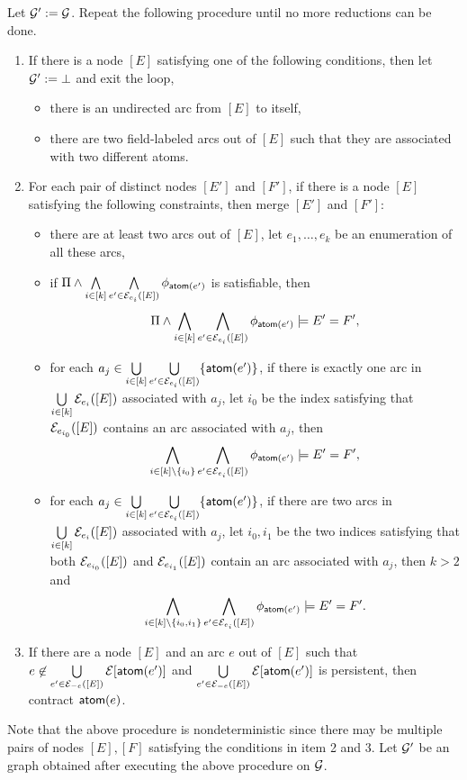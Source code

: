 \documentclass{llncs}
\begin{document}
\medskip
\noindent Let $\mathcal{G}':=\mathcal{G}$. Repeat the following procedure until no more reductions can be done.
\begin{enumerate}
\item If there is a node $[E]$ satisfying one of the following conditions, then let $\mathcal{G}':=\bot$ and exit the loop,
\begin{itemize}
\item there is an undirected arc from $[E]$ to itself,
%
\item there are two field-labeled arcs out of $[E]$ such that they are associated with two different atoms.
\end{itemize}
%
\item For each pair of distinct nodes $[E']$ and $[F']$, if there is a node $[E]$ satisfying the following constraints, then  merge $[E']$ and $[F']$: 
\begin{itemize}
\item there are at least two arcs out of $[E]$, let $e_1,\dots, e_k$ be an enumeration of all these arcs, 

\item if $\Pi \wedge \bigwedge \limits_{i \in [k]} \bigwedge \limits_{e' \in \mathcal{E}_{e_i}([E])} \phi_{\mathsf{atom}(e')}$ is satisfiable, then 
\[\Pi \wedge \bigwedge \limits_{i \in [k]} \bigwedge \limits_{e' \in \mathcal{E}_{e_i}([E])} \phi_{\mathsf{atom}(e')} \models E'=F',\]
%
\item for each $a_j \in \bigcup \limits_{i \in [k]} \bigcup \limits_{e' \in \mathcal{E}_{e_i}([E])} \{\mathsf{atom}(e')\}$, if there is exactly one arc in $\bigcup \limits_{i \in [k] }  \mathcal{E}_{e_i}([E])$ associated with $a_j$, let $i_0$ be the index satisfying that $\mathcal{E}_{e_{i_0}}([E])$ contains an arc associated with $a_j$, then 
\[\bigwedge \limits_{i \in [k]  \setminus\{i_0\} } \bigwedge \limits_{e' \in \mathcal{E}_{e_i}([E])} \phi_{\mathsf{atom}(e')} \models E' = F',\]
%
\item for each $a_j \in \bigcup \limits_{ i \in [k]} \bigcup \limits_{e' \in \mathcal{E}_{e_i}([E])} \{\mathsf{atom}(e')\}$, if there are two arcs in $\bigcup \limits_{ i \in [k] }  \mathcal{E}_{e_i}([E])$ associated with $a_j$, let $i_0, i_1$ be the two indices satisfying that both $\mathcal{E}_{e_{i_0}}([E])$ and $\mathcal{E}_{e_{i_1}}([E])$ contain an arc associated with $a_j$, then $k > 2$ and 
\[
\bigwedge \limits_{ i \in [k] \setminus \{i_0, i_1\} } \bigwedge \limits_{e' \in \mathcal{E}_{e_i}([E])} \phi_{\mathsf{atom}(e')} \models E' = F'.
\]
\end{itemize}
%
\item If there are a node $[E]$ and an arc $e$ out of $[E]$ such that $e \not \in \bigcup \limits_{ e' \in \mathcal{E}_{-e}([E])} \mathcal{E}[\mathsf{atom}(e')]$ and $\bigcup \limits_{ e' \in \mathcal{E}_{-e}([E])} \mathcal{E}[\mathsf{atom}(e')]$ is persistent, then contract $\mathsf{atom}(e)$.
\end{enumerate}
Note that the above procedure is nondeterministic since there may be multiple pairs of nodes $[E],[F]$ satisfying the conditions in item 2 and 3.
Let $\mathcal{G}'$ be an graph obtained after executing the above procedure on $\mathcal{G}$.
\end{document}
